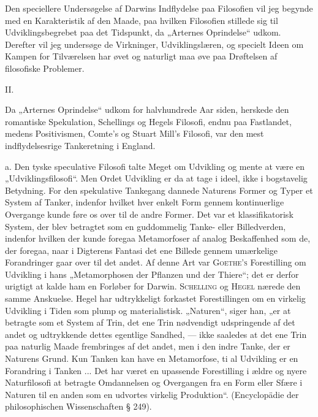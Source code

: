 \documentclass[12pt,a4paper,openany]{book}
\newcommand{\opage}[1]{\marginnote{\footnotesize\textit{[#1]}}}
\begin{document}
Den speciellere Undersøgelse af Darwins Indflydelse paa
Filosofien vil jeg begynde med en Karakteristik af den Maade,
paa hvilken Filosofien stillede sig til Udviklingsbegrebet paa det
Tidspunkt, da „Arternes Oprindelse“ udkom. Derefter vil jeg
undersøge de Virkninger, Udviklingslæren, og specielt Ideen
om Kampen for Tilværelsen har øvet og naturligt maa øve paa
Drøftelsen af filosofiske Problemer.

\begin{center}II.\end{center}


Da „Arternes Oprindelse“ udkom for halvhundrede Aar
siden, herskede den romantiske Spekulation, Schellings og
Hegels Filosofi, endnu paa Fastlandet, medens Positivismen,
Comte’s og Stuart Mill’s Filosofi, var den mest indflydelsesrige
Tankeretning i England.

a. Den tyske speculative Filosofi talte Meget om Udvikling
\setcounter{footnote}{0}%
\opage{206}og mente at være en „Udviklingsfilosofi“. Men Ordet Udvikling
er da at tage i ideel, ikke i bogstavelig Betydning. For
den spekulative Tankegang dannede Naturens Former og Typer
et System af Tanker, indenfor hvilket hver enkelt Form gennem
kontinuerlige Overgange kunde føre os over til de andre
Former. Det var et klassifikatorisk System, der blev betragtet
som en guddommelig Tanke- eller Billedverden, indenfor hvilken
der kunde foregaa Metamorfoser af analog Beskaffenhed som
de, der foregaa, naar i Digterens Fantasi det ene Billede gennem
umærkelige Forandringer gaar over til det andet. Af
denne Art var \textsc{Goethe’s} Forestilling om Udvikling i hans
„Metamorphosen der Pflanzen und der Thiere“; det er derfor
urigtigt at kalde ham en Forløber for Darwin. \textsc{Schelling} og
\textsc{Hegel} nærede den samme Anskuelse. Hegel har udtrykkeligt
forkastet Forestillingen om en virkelig Udvikling i Tiden som
plump og materialistisk. „Naturen“, siger han, „er at betragte
som et System af Trin, det ene Trin nødvendigt udspringende
af det andet og udtrykkende dettes egentlige Sandhed, --- ikke
saaledes at det ene Trin paa naturlig Maade frembringes af det
andet, men i den indre Tanke, der er Naturens Grund. Kun
Tanken kan have en Metamorfose, ti al Udvikling er en Forandring
i Tanken ... Det har været en upassende Forestilling
i ældre og nyere Naturfilosofi at betragte Omdannelsen og
Overgangen fra en Form eller Sfære i Naturen til en anden
som en udvortes virkelig Produktion“. (Encyclopädie der philosophischen
Wissenschaften § 249).
\end{document}
